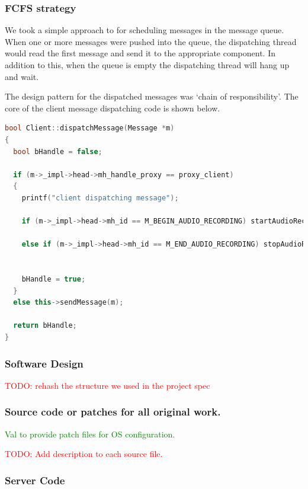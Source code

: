 \documentclass[11pt,a4paper,titlepage]{report}
\begin{document}
\subsubsection{FCFS strategy}

We took a simple approach to for scheduling messages in the message queue. When one or more messages were pushed into the queue, the dispatching thread would read the first message and send it to the appropriate component. In addition to this, when the queue is empty the dispatching thread will hang up and wait.

The design pattern for the dispatched messages was `chain of responsibility'. The core of the client message dispatching code is shown below.

\begin{lstlisting}[caption={Example of message dispatch},language=C++]
bool Client::dispatchMessage(Message *m)
{
  bool bHandle = false;

  if (m->_impl->head->mh_handle_proxy == proxy_client)
  {
    printf("client dispatching message");

    if (m->_impl->head->mh_id == M_BEGIN_AUDIO_RECORDING) startAudioRecording();

    else if (m->_impl->head->mh_id == M_END_AUDIO_RECORDING) stopAudioRecording();


    bHandle = true;
  }
  else this->sendMessage(m);

  return bHandle;
}
\end{lstlisting}





\subsubsection{Software Design}

\textcolor{red}{TODO: rehash the structure we used in the project spec}


\subsubsection{Source code or patches for all original work.}


\textcolor{green}{Val to provide patch files for OS configuration.}

\textcolor{red}{TODO: Add description to each source file.}


\subsubsection{Server Code}
\end{document}
